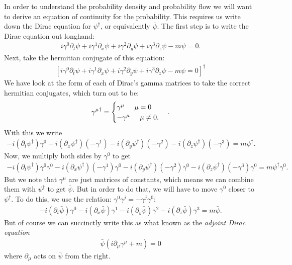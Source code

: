 \documentclass{book}
\theoremstyle{definition}
\newcommand{\p}{\partial}
\newcommand{\lb}{\left[}
\newcommand{\rb}{\right]}
\begin{document}
In order to understand the probability density and probability flow we will want to derive an equation of continuity for the probability. This requires us write down the Dirac equation for $\psi^\dagger$, or equivalently $\bar{\psi}$. The first step is to write the Dirac equation out longhand:
\begin{align}
i\gamma^0 \p_t \psi + i\gamma^1 \p_x \psi + i\gamma^2 \p_y\psi + i\gamma^3 \p_z \psi - m\psi = 0. 
\end{align}
Next, take the hermitian conjugate of this equation:
\begin{align}
\lb i\gamma^0 \p_t \psi + i\gamma^1 \p_x \psi + i\gamma^2 \p_y\psi + i\gamma^3 \p_z \psi - m\psi = 0\rb^\dagger
\end{align}
We have look at the form of each of Dirac's gamma matrices to take the correct hermitian conjugates, which turn out to be:
\begin{align}
{\gamma^\mu}^\dagger
=
\begin{cases}
\gamma^\mu \hspace{0.5cm} \mu = 0\\
-\gamma^\mu \hspace{0.5cm} \mu \neq 0.
\end{cases}.
\end{align}
With this we write
\begin{align}
-i (\p_t \psi^\dagger)\gamma^0 - i ( \p_x \psi^\dagger)(-\gamma^1) - i(\p_y\psi^\dagger)(-\gamma^2) - i (\p_z \psi^\dagger)(-\gamma^3) = m\psi^\dagger .
\end{align}
Now, we multiply both sides by $\gamma^0$ to get
\begin{align}
-i (\p_t \psi^\dagger)\gamma^0\gamma^0 - i (\p_x \psi^\dagger)(-\gamma^1)\gamma^0 - i(\p_y\psi^\dagger)(-\gamma^2)\gamma^0 - i (\p_z \psi^\dagger)(-\gamma^3)\gamma^0 = m\psi^\dagger\gamma^0.
\end{align}
But we note that $\gamma^\mu$ are just matrices of constants, which means we can combine them with $\psi^\dagger$ to get $\bar{\psi}$. But in order to do that, we will have to move $\gamma^0$ closer to $\psi^\dagger$. To do this, we use the relation: $\gamma^0 \gamma^j = -\gamma^j \gamma^0$:
\begin{align}
-i (\p_t \bar{\psi})\gamma^0 - i (\p_x \bar{\psi})\gamma^1   -i(\p_y\bar{\psi})\gamma^2 - i (\p_z \bar{\psi})\gamma^3 = m\bar{\psi}.
\end{align} 
But of course we can succinctly write this as what known as the \textit{adjoint Dirac equation}
\begin{align}
\boxed{\bar{\psi}(i\p_\mu \gamma^\mu + m) = 0}
\end{align} 
where $\p_\mu$ acts on $\bar{\psi}$ from the right. \\
\end{document}
